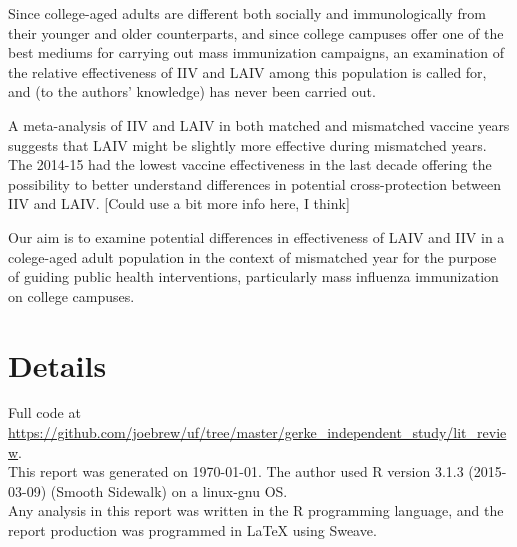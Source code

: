 \documentclass[11pt]{article}
\begin{document}
\begin{multicols}{2}
Since college-aged adults are different both socially and immunologically from their younger and older counterparts, and since college campuses offer one of the best mediums for carrying out mass immunization campaigns, an examination of the relative effectiveness of IIV and LAIV among this population is called for, and (to the authors' knowledge) has never been carried out.  

A meta-analysis of IIV and LAIV in both matched and mismatched vaccine years suggests that LAIV might be slightly more effective during mismatched years. \cite{Tricco2013} The 2014-15 had the lowest vaccine effectiveness in the last decade offering the possibility to better understand differences in potential cross-protection between IIV and LAIV.  [Could use a bit more info here, I think]  

Our aim is to examine potential differences in effectiveness of LAIV and IIV in a colege-aged adult population in the context of mismatched year for the purpose of guiding public health interventions, particularly mass influenza immunization on college campuses.









\end{multicols}
\newpage
{}



\newpage
\section*{Details}
\hrulefill

\vspace{10mm}
Full code at \href{https://github.com/joebrew/uf/tree/master/gerke\_independent\_study/lit\_review}{https://github.com/joebrew/uf/tree/master/gerke\_independent\_study/lit\_review}. \\

This report was generated on \today.  The author used R version 3.1.3 (2015-03-09) (Smooth Sidewalk) on a linux-gnu OS.  \\

Any analysis in this report was written in the R programming language, and the report production was programmed in \LaTeX{} using Sweave.\\
\end{document}
